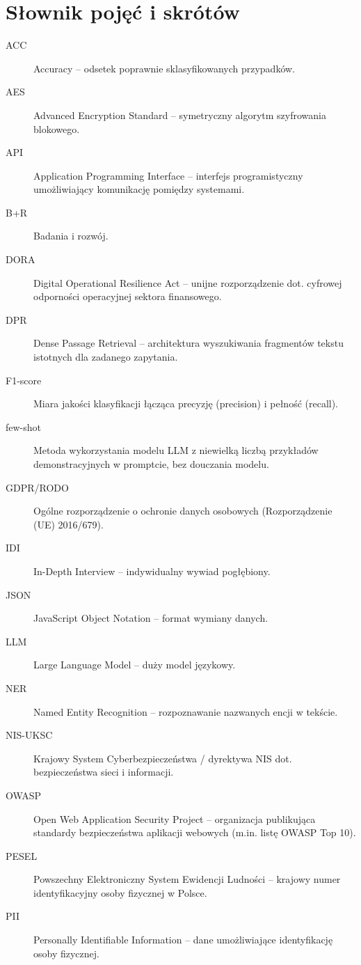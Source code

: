 \documentclass[12pt,a4paper]{report}
\begin{document}
\section*{Słownik pojęć i skrótów}
\begin{description}
    \item[ACC] Accuracy -- odsetek poprawnie sklasyfikowanych przypadków.
    \item[AES] Advanced Encryption Standard -- symetryczny algorytm szyfrowania blokowego.
    \item[API] Application Programming Interface -- interfejs programistyczny umożliwiający komunikację pomiędzy systemami.
    \item[B+R] Badania i rozwój.
    \item[DORA] Digital Operational Resilience Act -- unijne rozporządzenie dot. cyfrowej odporności operacyjnej sektora finansowego.
    \item[DPR] Dense Passage Retrieval -- architektura wyszukiwania fragmentów tekstu istotnych dla zadanego zapytania.
    \item[F1-score] Miara jakości klasyfikacji łącząca precyzję (precision) i pełność (recall).
    \item[few-shot] Metoda wykorzystania modelu LLM z niewielką liczbą przykładów demonstracyjnych w promptcie, bez douczania modelu.
    \item[GDPR/RODO] Ogólne rozporządzenie o ochronie danych osobowych (Rozporządzenie (UE) 2016/679).
    \item[IDI] In-Depth Interview -- indywidualny wywiad pogłębiony.
    \item[JSON] JavaScript Object Notation -- format wymiany danych.
    \item[LLM] Large Language Model -- duży model językowy.
    \item[NER] Named Entity Recognition -- rozpoznawanie nazwanych encji w tekście.
    \item[NIS-UKSC] Krajowy System Cyberbezpieczeństwa / dyrektywa NIS dot. bezpieczeństwa sieci i informacji.
    \item[OWASP] Open Web Application Security Project -- organizacja publikująca standardy bezpieczeństwa aplikacji webowych (m.in. listę OWASP Top 10).
    \item[PESEL] Powszechny Elektroniczny System Ewidencji Ludności -- krajowy numer identyfikacyjny osoby fizycznej w Polsce.
    \item[PII] Personally Identifiable Information -- dane umożliwiające identyfikację osoby fizycznej.

\end{description}
\end{document}
